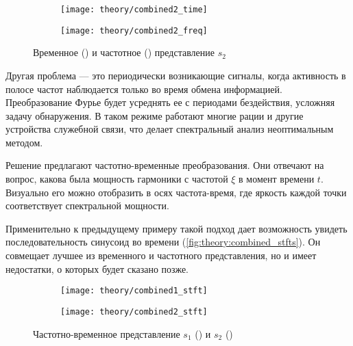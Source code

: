\begin{figure}[h]
  \centering
  \begin{subfigure}{0.45\textwidth}
    \texttt{[image: theory/combined2\_time]}
    \caption{}
    \label{fig:theory:combined2_time}
  \end{subfigure}
  \begin{subfigure}{0.45\textwidth}
    \texttt{[image: theory/combined2\_freq]}
    \caption{}
    \label{fig:theory:combined2_freq}
  \end{subfigure}
  \caption{Временное () и частотное () представление $s_2$}
  \label{fig:theory:combined2}
\end{figure}

Другая проблема --- это периодически возникающие сигналы, когда активность в полосе частот наблюдается только во время обмена информацией. Преобразование Фурье будет усреднять ее с периодами бездействия, усложняя задачу обнаружения. В таком режиме работают многие рации и другие устройства служебной связи, что делает спектральный анализ неоптимальным методом.

Решение предлагают частотно-временные преобразования. Они отвечают на вопрос, какова была мощность гармоники с частотой $\xi$ в момент времени $t$. Визуально его можно отобразить в осях частота-время, где яркость каждой точки соответствует спектральной мощности.

Применительно к предыдущему примеру такой подход дает возможность увидеть последовательность синусоид во времени (\autoref{fig:theory:combined_stfts}). Он совмещает лучшее из временного и частотного представления, но и имеет недостатки, о которых будет сказано позже.

\begin{figure}[h]
  \centering
  \begin{subfigure}{0.45\textwidth}
    \texttt{[image: theory/combined1\_stft]}
    \caption{}
    \label{fig:theory:combined1_stft}
  \end{subfigure}
  \begin{subfigure}{0.45\textwidth}
    \texttt{[image: theory/combined2\_stft]}
    \caption{}
    \label{fig:theory:combined2_stft}
  \end{subfigure}
  \caption{Частотно-временное представление $s_1$ () и $s_2$ ()}
  \label{fig:theory:combined_stfts}
\end{figure}


